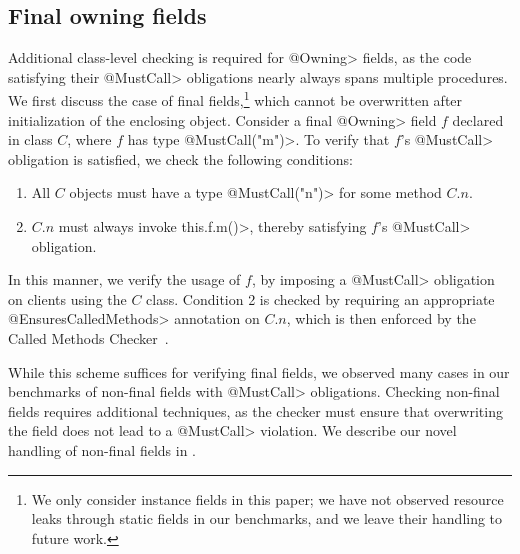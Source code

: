 
\subsection{Final owning fields}
\label{sec:owning-fields}

  Additional class-level checking is required for \<@Owning> fields, as the code
  satisfying their \<@MustCall> obligations nearly always spans multiple
  procedures.  We first discuss the case of final fields,\footnote{We only
  consider instance fields in this paper; we have not observed resource leaks
  through static fields in our benchmarks, and we leave their handling to future
  work.} which cannot be overwritten after initialization of the enclosing
  object.  Consider a final \<@Owning> field $f$ declared in class $C$, where
  $f$ has type \<@MustCall("m")>.  To
  verify that $f$'s \<@MustCall> obligation is satisfied, we check the following
  conditions:
  \begin{enumerate}
    \item All $C$ objects must have a type \<@MustCall("n")> for some method $C.n$.
    \item $C.n$ must always invoke \<this.f.m()>, thereby satisfying $f$'s
    \<@MustCall> obligation.
  \end{enumerate}
  In this manner, we verify the usage of $f$, by imposing
  a \<@MustCall> obligation on clients using the $C$ class.  Condition 2 is
  checked by requiring an appropriate \<@EnsuresCalledMethods> annotation on
  $C.n$, which is then enforced by the Called Methods
  Checker~\cite{KelloggRSSE2020}.  

  While this scheme suffices for verifying final fields, we observed many cases
  in our benchmarks of non-final fields with \<@MustCall> obligations.  Checking
  non-final fields requires additional techniques, as the checker must ensure
  that overwriting the field does not lead to a \<@MustCall> violation.  We
  describe our novel handling of non-final fields in .


